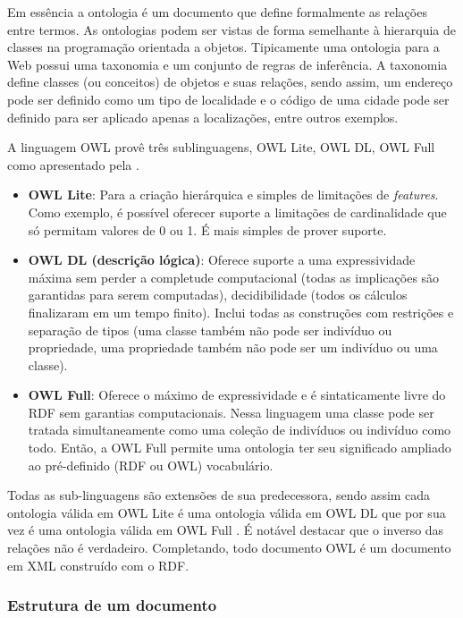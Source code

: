 Em essência a ontologia é um documento que define formalmente as relações entre termos. As ontologias podem ser vistas de forma semelhante à hierarquia de classes na programação orientada a objetos. Tipicamente uma ontologia para a Web possui uma taxonomia e um conjunto de regras de inferência. A taxonomia define classes (ou conceitos) de objetos e suas relações, sendo assim, um endereço pode ser definido como um tipo de localidade e o código de uma cidade pode ser definido para ser aplicado apenas a localizações, entre outros exemplos.

A linguagem OWL provê três sublinguagens, OWL Lite, OWL DL, OWL Full como apresentado pela \cite{OWLW3C}.

\begin{itemize}
	\item{\textbf{OWL Lite}: Para a criação hierárquica e simples de limitações de \textit{features}. Como exemplo, é possível oferecer suporte a limitações de cardinalidade que só permitam valores de 0 ou 1. É mais simples de prover suporte.}

	\item{\textbf{OWL DL (descrição lógica)}: Oferece suporte a uma expressividade máxima sem perder a completude computacional (todas as implicações são garantidas para serem computadas), decidibilidade (todos os cálculos finalizaram em um tempo finito). Inclui todas as construções com restrições e separação de tipos (uma classe também não pode ser indivíduo ou propriedade, uma propriedade também não pode ser um indivíduo ou uma classe).}

	\item{\textbf{OWL Full}: Oferece o máximo de expressividade e é sintaticamente livre do RDF sem garantias computacionais. Nessa linguagem uma classe pode ser tratada simultaneamente como uma coleção de indivíduos ou indivíduo como todo. Então, a OWL Full permite uma ontologia ter seu significado ampliado ao pré-definido (RDF ou OWL) vocabulário.}
\end{itemize}

Todas as sub-linguagens são extensões de sua predecessora, sendo assim cada ontologia válida em OWL Lite é uma ontologia válida em OWL DL que por sua vez é uma ontologia válida em OWL Full \citep{OWLW3C}. É notável destacar que o inverso das relações não é verdadeiro. Completando, todo documento OWL é um documento em XML construído com o RDF.

\subsubsection{Estrutura de um documento}

